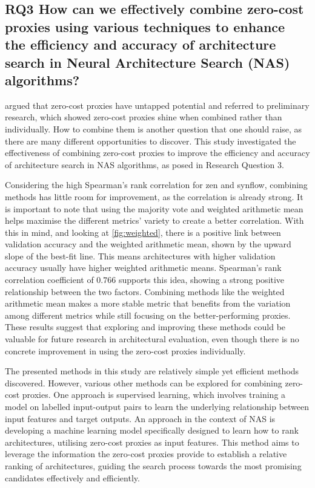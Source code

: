 \subsection{RQ3 How can we effectively combine zero-cost proxies using various techniques to enhance the efficiency and accuracy of architecture search in Neural Architecture Search (NAS) algorithms?}

\cite{colin2022adeeperlook} argued that zero-cost proxies have untapped potential and referred to preliminary research, which showed zero-cost proxies shine when combined rather than individually. How to combine them is another question that one should raise, as there are many different opportunities to discover. This study investigated the effectiveness of combining zero-cost proxies to improve the efficiency and accuracy of architecture search in NAS algorithms, as posed in Research Question 3. 

Considering the high Spearman's rank correlation for zen and synflow, combining methods has little room for improvement, as the correlation is already strong. It is important to note that using the majority vote and weighted arithmetic mean helps maximise the different metrics' variety to create a better correlation. With this in mind, and looking at \cref{fig:weighted}, there is a positive link between validation accuracy and the weighted arithmetic mean, shown by the upward slope of the best-fit line. This means architectures with higher validation accuracy usually have higher weighted arithmetic means. Spearman's rank correlation coefficient of $0.766$ supports this idea, showing a strong positive relationship between the two factors. Combining methods like the weighted arithmetic mean makes a more stable metric that benefits from the variation among different metrics while still focusing on the better-performing proxies. These results suggest that exploring and improving these methods could be valuable for future research in architectural evaluation, even though there is no concrete improvement in using the zero-cost proxies individually. 

The presented methods in this study are relatively simple yet efficient methods discovered. However, various other methods can be explored for combining zero-cost proxies. One approach is supervised learning,  which involves training a model on labelled input-output pairs to learn the underlying relationship between input features and target outputs. An approach in the context of NAS is developing a machine learning model specifically designed to learn how to rank architectures, utilising zero-cost proxies as input features. This method aims to leverage the information the zero-cost proxies provide to establish a relative ranking of architectures, guiding the search process towards the most promising candidates effectively and efficiently. 

